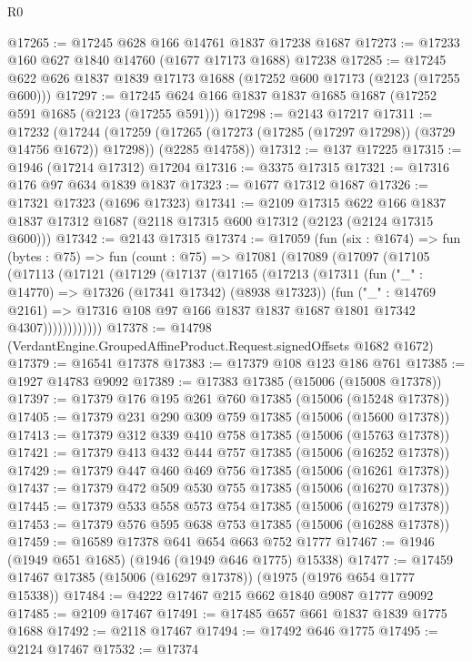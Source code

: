 \begin{lexlean}{R0}
\begin{coremodule}
@17265 := @17245 @628 @166 @14761 @1837 @17238 @1687
@17273 := @17233 @160 @627 @1840 @14760 (@1677 @17173 @1688) @17238
@17285 := @17245 @622 @626 @1837 @1839 @17173 @1688 (@17252 @600 @17173 (@2123 (@17255 @600)))
@17297 := @17245 @624 @166 @1837 @1837 @1685 @1687 (@17252 @591 @1685 (@2123 (@17255 @591)))
@17298 := @2143 @17217
@17311 := @17232
    (@17244
      (@17259 (@17265 (@17273 (@17285 (@17297 @17298)) (@3729 @14756 @1672)) @17298))
      (@2285 @14758))
@17312 := @137 @17225
@17315 := @1946 (@17214 @17312) @17204
@17316 := @3375 @17315
@17321 := @17316 @176 @97 @634 @1839 @1837
@17323 := @1677 @17312 @1687
@17326 := @17321 @17323 (@1696 @17323)
@17341 := @2109
    @17315
    @622
    @166
    @1837
    @1837
    @17312
    @1687
    (@2118 @17315 @600 @17312 (@2123 (@2124 @17315 @600)))
@17342 := @2143 @17315
@17374 := @17059
    (fun (six : @1674) =>
    fun (bytes : @75) =>
    fun (count : @75) =>
    @17081
      (@17089
        (@17097
          (@17105
            (@17113
              (@17121
                (@17129
                  (@17137
                    (@17165
                      (@17213
                        (@17311
                          (fun ("_" : @14770) => @17326 (@17341 @17342) (@8938 @17323))
                          (fun ("_" : @14769 @2161) =>
                          @17316 @108 @97 @166 @1837 @1837 @1687 @1801 @17342 @4307))))))))))))
@17378 := @14798 (VerdantEngine.GroupedAffineProduct.Request.signedOffsets @1682 @1672)
@17379 := @16541 @17378
@17383 := @17379 @108 @123 @186 @761
@17385 := @1927 @14783 @9092
@17389 := @17383 @17385 (@15006 (@15008 @17378))
@17397 := @17379 @176 @195 @261 @760 @17385 (@15006 (@15248 @17378))
@17405 := @17379 @231 @290 @309 @759 @17385 (@15006 (@15600 @17378))
@17413 := @17379 @312 @339 @410 @758 @17385 (@15006 (@15763 @17378))
@17421 := @17379 @413 @432 @444 @757 @17385 (@15006 (@16252 @17378))
@17429 := @17379 @447 @460 @469 @756 @17385 (@15006 (@16261 @17378))
@17437 := @17379 @472 @509 @530 @755 @17385 (@15006 (@16270 @17378))
@17445 := @17379 @533 @558 @573 @754 @17385 (@15006 (@16279 @17378))
@17453 := @17379 @576 @595 @638 @753 @17385 (@15006 (@16288 @17378))
@17459 := @16589 @17378 @641 @654 @663 @752 @1777
@17467 := @1946 (@1949 @651 @1685) (@1946 (@1949 @646 @1775) @15338)
@17477 := @17459 @17467 @17385 (@15006 (@16297 @17378)) (@1975 (@1976 @654 @1777 @15338))
@17484 := @4222 @17467 @215 @662 @1840 @9087 @1777 @9092
@17485 := @2109 @17467
@17491 := @17485 @657 @661 @1837 @1839 @1775 @1688
@17492 := @2118 @17467
@17494 := @17492 @646 @1775
@17495 := @2124 @17467
@17532 := @17374

\end{coremodule}
\end{lexlean}
